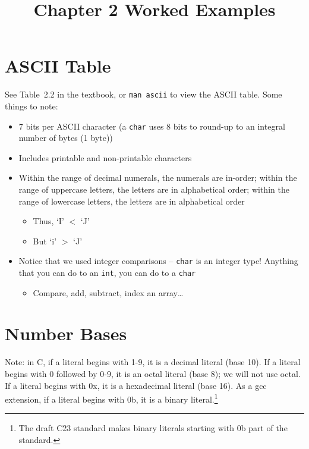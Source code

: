 \documentclass{article}
\begin{document}
\title{Chapter 2 Worked Examples}
\date{}
\maketitle

\section{ASCII Table}

See Table~2.2 in the textbook, or \texttt{man ascii} to view the ASCII table.
Some things to note:
\begin{itemize}
\item 7 bits per ASCII character (a \texttt{char} uses 8 bits to round-up to an
    integral number of bytes (1 byte))
\item Includes printable and non-printable characters
\item Within the range of decimal numerals, the numerals are in-order; within
    the range of uppercase letters, the letters are in alphabetical order;
    within the range of lowercase letters, the letters are in alphabetical order
    \begin{itemize}
    \item Thus, `I' $<$ `J'
    \item But `i' $>$ `J'
    \end{itemize}
\item Notice that we used integer comparisons -- \texttt{char} is an integer
    type! Anything that you can do to an \texttt{int}, you can do to a
    \texttt{char}
    \begin{itemize}
    \item Compare, add, subtract, index an array\dots
    \end{itemize}
\end{itemize}

\section{Number Bases}

Note: in C, if a literal begins with 1-9, it is a decimal literal (base 10). If
a literal begins with 0 followed by 0-9, it is an octal literal (base 8); we
will not use octal. If a literal begins with 0x, it is a hexadecimal literal
(base 16). As a gcc extension, if a literal begins with 0b, it is a binary
literal.\footnote{The draft C23 standard makes binary literals starting with 0b
part of the standard.}
\end{document}
